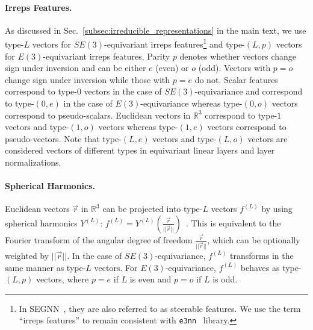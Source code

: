 \paragraph{Irreps Features.}
As discussed in Sec.~\ref{subsec:irreducible_representations} in the main text, we use type-$L$ vectors for $SE(3)$-equivariant irreps features\footnote{In SEGNN~\citep{segnn}, they are also referred to as steerable features. We use the term ``irreps features'' to remain consistent with \texttt{e3nn}~\citep{e3nn} library.} and type-$(L, p)$ vectors for $E(3)$-equivariant irreps features.
Parity $p$ denotes whether vectors change sign under inversion and can be either $e$ (even) or $o$ (odd).
Vectors with $p = o$ change sign under inversion while those with $p = e$ do not.
Scalar features correspond to type-$0$ vectors in the case of $SE(3)$-equivariance and correspond to type-$(0, e)$ in the case of $E(3)$-equivariance whereas type-$(0, o)$ vectors correspond to pseudo-scalars.
Euclidean vectors in $\mathbb{R}^3$ correspond to type-$1$ vectors and type-$(1, o)$ vectors whereas type-$(1, e)$ vectors correspond to pseudo-vectors.
Note that type-$(L, e)$ vectors and type-$(L, o)$ vectors are considered vectors of different types in equivariant linear layers and layer normalizations.

\paragraph{Spherical Harmonics.}
Euclidean vectors $\vec{r}$ in $\mathbb{R}^3$ can be projected into type-$L$ vectors $f^{(L)}$ by using spherical harmonics $Y^{(L)}$: $f^{(L)} = Y^{(L)}(\frac{\vec{r}}{|| \vec{r} ||})$~\citep{finding_symmetry_breaking_order}.
This is equivalent to the Fourier transform of the angular degree of freedom $\frac{\vec{r}}{|| \vec{r}||}$, which can be optionally weighted by $|| \vec{r} ||$. 
In the case of $SE(3)$-equivariance, $f^{(L)}$ transforms in the same manner as type-$L$ vectors.
For $E(3)$-equivariance, $f^{(L)}$ behaves as type-$(L, p)$ vectors, where $p = e$ if $L$ is even and $p = o$ if $L$ is odd.


